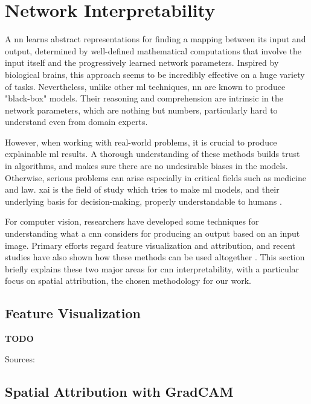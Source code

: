 \section{Network Interpretability}
\label{sec:network-interpretability}


A \gls{nn} learns abstract representations for finding a mapping between its input and output, determined by well-defined mathematical computations that involve the input itself and the progressively learned network parameters. Inspired by biological brains, this approach seems to be incredibly effective on a huge variety of tasks. Nevertheless, unlike other \gls{ml} techniques, \gls{nn} are known to produce "black-box" models. Their reasoning and comprehension are intrinsic in the network parameters, which are nothing but numbers, particularly hard to understand even from domain experts. 

However, when working with real-world problems, it is crucial to produce explainable \gls{ml} results. A thorough understanding of these methods builds trust in algorithms, and makes sure there are no undesirable biases in the models. Otherwise, serious problems can arise especially in critical fields such as medicine and law. \gls{xai} is the field of study which tries to make \gls{ml} models, and their underlying basis for decision-making, properly understandable to humans \cite{xai-wiki}.

For computer vision, researchers have developed some techniques for understanding what a \gls{cnn} considers for producing an output based on an input image. Primary efforts regard feature visualization and attribution, and recent studies have also shown how these methods can be used altogether \cite{olah2018the}. This section briefly explains these two major areas for \gls{cnn} interpretability, with a particular focus on spatial attribution, the chosen methodology for our work.



\subsection{Feature Visualization}

\textbf{TODO}

Sources: \cite{olah2017feature}



\subsection{Spatial Attribution with GradCAM}
\label{subsec:gradcam-theory}

